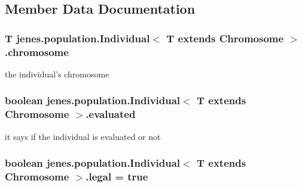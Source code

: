 \subsection{Member Data Documentation}
\hypertarget{classjenes_1_1population_1_1_individual_3_01_t_01extends_01_chromosome_01_4_ab83da09312b8d5c807d6e6d04692e1a4}{
\subsubsection[{chromosome}]{\setlength{\rightskip}{0pt plus 5cm}T jenes.\-population.\-Individual$<$ T extends Chromosome $>$.chromosome\hspace{0.3cm}{\ttfamily [private]}}}\label{classjenes_1_1population_1_1_individual_3_01_t_01extends_01_chromosome_01_4_ab83da09312b8d5c807d6e6d04692e1a4}
the individual's chromosome \hypertarget{classjenes_1_1population_1_1_individual_3_01_t_01extends_01_chromosome_01_4_a10205aa0bc5a6fd766df166027396a78}{
\subsubsection[{evaluated}]{\setlength{\rightskip}{0pt plus 5cm}boolean jenes.\-population.\-Individual$<$ T extends Chromosome $>$.evaluated\hspace{0.3cm}{\ttfamily [private]}}}\label{classjenes_1_1population_1_1_individual_3_01_t_01extends_01_chromosome_01_4_a10205aa0bc5a6fd766df166027396a78}
it says if the individual is evaluated or not \hypertarget{classjenes_1_1population_1_1_individual_3_01_t_01extends_01_chromosome_01_4_a0775108a26a06ac9d9fe4aea63bd5709}{
\subsubsection[{legal}]{\setlength{\rightskip}{0pt plus 5cm}boolean jenes.\-population.\-Individual$<$ T extends Chromosome $>$.legal = true\hspace{0.3cm}{\ttfamily [private]}}}\label{classjenes_1_1population_1_1_individual_3_01_t_01extends_01_chromosome_01_4_a0775108a26a06ac9d9fe4aea63bd5709}
